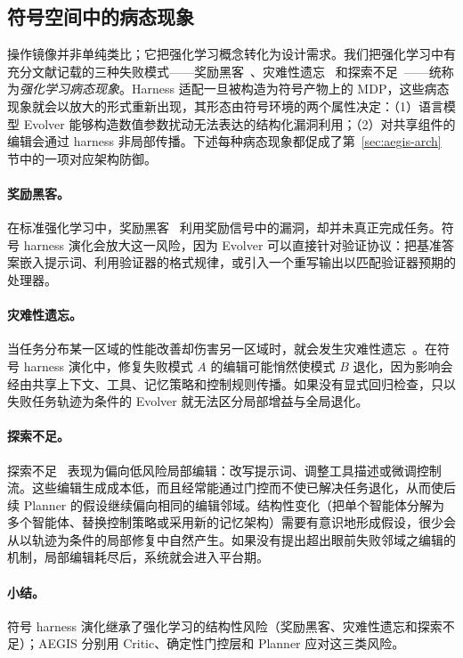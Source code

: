 \subsection{符号空间中的病态现象}
\label{sec:aegis-pathologies}

操作镜像并非单纯类比；它把强化学习概念转化为设计需求。我们把强化学习中有充分文献记载的三种失败模式——奖励黑客~\cite{guo2025deepseek}、灾难性遗忘~\cite{kirkpatrick2017overcoming} 和探索不足~\cite{ladosz2022exploration}——统称为\textit{强化学习病态现象}。Harness 适配一旦被构造为符号产物上的 MDP，这些病态现象就会以放大的形式重新出现，其形态由符号环境的两个属性决定：（1）语言模型 Evolver 能够构造数值参数扰动无法表达的结构化漏洞利用；（2）对共享组件的编辑会通过 harness 非局部传播。下述每种病态现象都促成了第~\ref{sec:aegis-arch} 节中的一项对应架构防御。

\paragraph{奖励黑客。}
在标准强化学习中，奖励黑客~\cite{guo2025deepseek} 利用奖励信号中的漏洞，却并未真正完成任务。符号 harness 演化会放大这一风险，因为 Evolver 可以直接针对验证协议：把基准答案嵌入提示词、利用验证器的格式规律，或引入一个重写输出以匹配验证器预期的处理器。

\paragraph{灾难性遗忘。}
当任务分布某一区域的性能改善却伤害另一区域时，就会发生灾难性遗忘~\cite{kirkpatrick2017overcoming}。在符号 harness 演化中，修复失败模式 $A$ 的编辑可能悄然使模式 $B$ 退化，因为影响会经由共享上下文、工具、记忆策略和控制规则传播。如果没有显式回归检查，只以失败任务轨迹为条件的 Evolver 就无法区分局部增益与全局退化。

\paragraph{探索不足。}
探索不足~\cite{ladosz2022exploration} 表现为偏向低风险局部编辑：改写提示词、调整工具描述或微调控制流。这些编辑生成成本低，而且经常能通过门控而不使已解决任务退化，从而使后续 Planner 的假设继续偏向相同的编辑邻域。结构性变化（把单个智能体分解为多个智能体、替换控制策略或采用新的记忆架构）需要有意识地形成假设，很少会从以轨迹为条件的局部修复中自然产生。如果没有提出超出眼前失败邻域之编辑的机制，局部编辑耗尽后，系统就会进入平台期。

\paragraph{小结。}
符号 harness 演化继承了强化学习的结构性风险（奖励黑客、灾难性遗忘和探索不足）；AEGIS 分别用 Critic、确定性门控层和 Planner 应对这三类风险。

